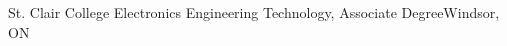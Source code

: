 \resumeSubheading
{St. Clair College}{}
{Electronics Engineering Technology, Associate Degree}{Windsor, ON}
\resumeItemListStart
{}
\resumeItemListEnd